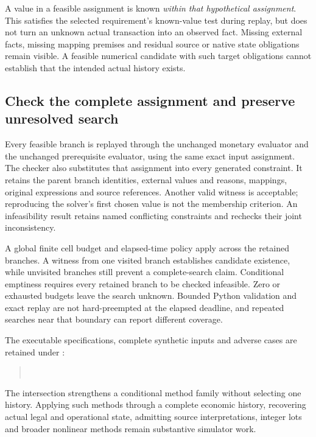 A value in a feasible assignment is known \emph{within that hypothetical
assignment}. This satisfies the selected requirement's known-value test during
replay, but does not turn an unknown actual transaction into an observed fact.
Missing external facts, missing mapping premises and residual source or native
state obligations remain visible. A feasible numerical candidate with such
target obligations cannot establish that the intended actual history exists.

\subsection{Check the complete assignment and preserve unresolved search}

Every feasible branch is replayed through the unchanged monetary evaluator and
the unchanged prerequisite evaluator, using the same exact input assignment.
The checker also substitutes that assignment into every generated constraint.
It retains the parent branch identities, external values and reasons, mappings,
original expressions and source references. Another valid witness is acceptable;
reproducing the solver's first chosen value is not the membership criterion.
An infeasibility result retains named conflicting constraints and rechecks their
joint inconsistency.

A global finite cell budget and elapsed-time policy apply across the retained
branches. A witness from one visited branch establishes candidate existence,
while unvisited branches still prevent a complete-search claim. Conditional
emptiness requires every retained branch to be checked infeasible. Zero or
exhausted budgets leave the search unknown. Bounded Python validation and exact
replay are not hard-preempted at the elapsed deadline, and repeated searches near
that boundary can report different coverage.

The executable specifications, complete synthetic inputs and adverse cases are
retained under :
\begin{quote}\small
{}\\
\end{quote}
The intersection strengthens a
conditional method family without selecting one history. Applying such methods
through a complete economic history, recovering actual legal and operational
state, admitting source interpretations, integer lots and broader nonlinear
methods remain substantive simulator work.

